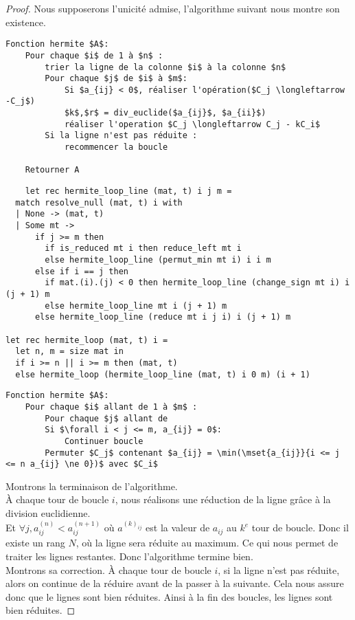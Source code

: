 \documentclass[11pt]{article}
\begin{document}
\begin{proof}


	Nous supposerons l'unicité admise, l'algorithme suivant nous montre son existence.

	\begin{lstlisting}
Fonction hermite $A$:
	Pour chaque $i$ de 1 à $n$ :
		trier la ligne de la colonne $i$ à la colonne $n$
		Pour chaque $j$ de $i$ à $m$:
			Si $a_{ij} < 0$, réaliser l'opération($C_j \longleftarrow -C_j$)
        	$k$,$r$ = div_euclide($a_{ij}$, $a_{ii}$)
            réaliser l'operation $C_j \longleftarrow C_j - kC_i$
		Si la ligne n'est pas réduite :
			recommencer la boucle

	Retourner A
\end{lstlisting}

	\begin{lstlisting}
	let rec hermite_loop_line (mat, t) i j m =
  match resolve_null (mat, t) i with
  | None -> (mat, t)
  | Some mt ->
      if j >= m then
        if is_reduced mt i then reduce_left mt i
        else hermite_loop_line (permut_min mt i) i i m
      else if i == j then
        if mat.(i).(j) < 0 then hermite_loop_line (change_sign mt i) i (j + 1) m
        else hermite_loop_line mt i (j + 1) m
      else hermite_loop_line (reduce mt i j i) i (j + 1) m

let rec hermite_loop (mat, t) i =
  let n, m = size mat in
  if i >= n || i >= m then (mat, t)
  else hermite_loop (hermite_loop_line (mat, t) i 0 m) (i + 1)
\end{lstlisting}

\begin{lstlisting}
Fonction hermite $A$:
	Pour chaque $i$ allant de 1 à $m$ :
		Pour chaque $j$ allant de  
		Si $\forall i < j <= m, a_{ij} = 0$:
			Continuer boucle
		Permuter $C_j$ contenant $a_{ij} = \min(\mset{a_{ij}}{i <= j <= n a_{ij} \ne 0})$ avec $C_i$
\end{lstlisting}

	Montrons la terminaison de l'algorithme.\\
	À chaque tour de boucle $i$, nous réalisons une réduction de la ligne grâce à la division
	euclidienne.\\
	Et $\forall j, a^{(n)}_{ij} < a^{(n + 1)}_{ij}$ où $a^{(k)_{ij}}$ est la valeur de $a_{ij}$
	au $k^e$ tour de boucle. Donc il existe un rang $N$, où la ligne sera réduite au maximum.
	Ce qui nous permet de traiter les lignes restantes. Donc l'algorithme termine bien.\\
	Montrons sa correction.
	À chaque tour de boucle $i$, si la ligne n'est pas réduite,
	alors on continue de la réduire avant de la passer à la suivante. Cela nous assure donc que le lignes sont bien réduites.
	Ainsi à la fin des boucles, les lignes sont bien réduites.



\end{proof}
\end{document}
